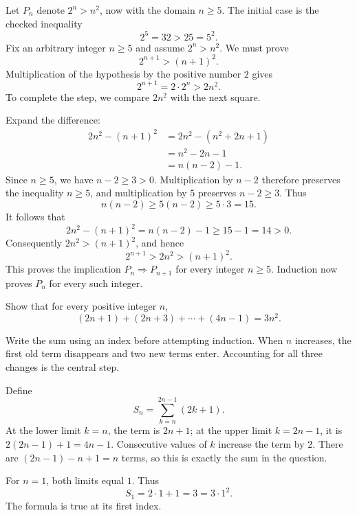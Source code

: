Let $P_n$ denote $2^n>n^2$, now with the domain $n\geq5$.
The initial case is the checked inequality
\[
 2^5=32>25=5^2.
\]
Fix an arbitrary integer $n\geq5$ and assume $2^n>n^2$.
We must prove
\[
 2^{n+1}>(n+1)^2.
\]
Multiplication of the hypothesis by the positive number $2$ gives
\[
 2^{n+1}=2\cdot2^n>2n^2.
\]
To complete the step, we compare $2n^2$ with the next square.

Expand the difference:
\begin{align*}
 2n^2-(n+1)^2
 &=2n^2-(n^2+2n+1)\\
 &=n^2-2n-1\\
 &=n(n-2)-1.
\end{align*}
Since $n\geq5$, we have $n-2\geq3>0$. Multiplication by $n-2$
therefore preserves the inequality $n\geq5$, and multiplication by $5$
preserves $n-2\geq3$. Thus
\[
 n(n-2)\geq5(n-2)\geq5\cdot3=15.
\]
It follows that
\[
 2n^2-(n+1)^2=n(n-2)-1\geq15-1=14>0.
\]
Consequently $2n^2>(n+1)^2$, and hence
\[
 2^{n+1}>2n^2>(n+1)^2.
\]
This proves the implication $P_n\Rightarrow P_{n+1}$ for every integer
$n\geq5$. Induction now proves $P_n$ for every such integer.



\goal Show that for every positive integer $n$,
\[
 (2n+1)+(2n+3)+\cdots+(4n-1)=3n^2.
\]

\idea Write the sum using an index before attempting induction.
When $n$ increases, the first old term disappears and two new terms enter.
Accounting for all three changes is the central step.

Define
\[
 S_n=\sum_{k=n}^{2n-1}(2k+1).
\]
At the lower limit $k=n$, the term is $2n+1$; at the upper limit
$k=2n-1$, it is $2(2n-1)+1=4n-1$. Consecutive values of $k$ increase
the term by $2$. There are $(2n-1)-n+1=n$ terms, so this is exactly
the sum in the question.

For $n=1$, both limits equal $1$. Thus
\[
 S_1=2\cdot1+1=3=3\cdot1^2.
\]
The formula is true at its first index.

